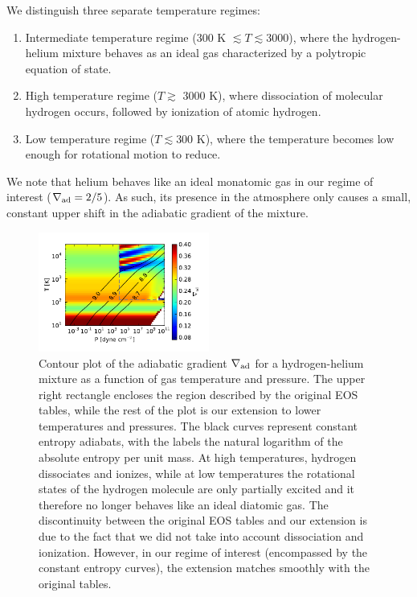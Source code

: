 \documentclass[apj]{emulateapj}
\newcommand{\delad}{\nabla_{\rm ad}}
\begin{document}
We distinguish three separate temperature regimes:



\begin{enumerate}
\item Intermediate temperature regime (300 K $\lesssim T \lesssim 3000$), where the hydrogen-helium mixture behaves as an ideal gas characterized by a polytropic equation of state.
\item High temperature regime ($T \gtrsim$ 3000 K), where dissociation of molecular hydrogen occurs, followed by ionization of atomic hydrogen.
\item Low temperature regime ($T \lesssim 300$ K), where the temperature becomes low enough for rotational motion to reduce.
\end{enumerate}

We note that helium behaves like an ideal monatomic gas in our regime of interest ($\delad=2/5$). As such, its presence in the atmosphere only causes a small, constant upper shift in the adiabatic gradient of the mixture.

\begin{figure}[h]
\centering
\includegraphics[width=0.5\textwidth]{../../figs/EOS/delad_S_mixt.pdf}
\caption{Contour plot of the adiabatic gradient $\delad$ for a hydrogen-helium mixture as a function of gas temperature and pressure. The upper right rectangle encloses the region described by the original \citet{saumon95} EOS tables, while the rest of the plot is our extension to lower temperatures and pressures. The black curves represent constant entropy adiabats, with the labels the natural logarithm of the absolute entropy per unit mass. At high temperatures, hydrogen dissociates and ionizes, while at low temperatures the rotational states of the hydrogen molecule are only partially excited and it therefore no longer behaves like an ideal diatomic gas. The discontinuity between the original EOS tables and our extension is due to the fact that we did not take into account dissociation and ionization. However, in our regime of interest (encompassed by the constant entropy curves), the extension matches smoothly with the original tables.}
\label{fig:deladmap}
\end{figure}
\end{document}
